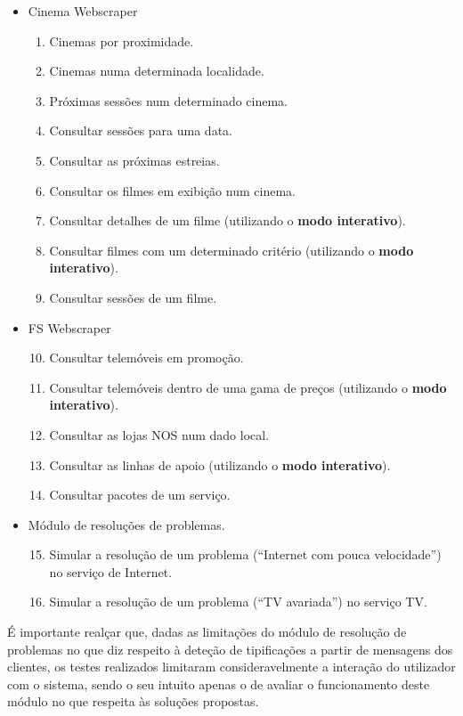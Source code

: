 \documentclass[11pt, a4paper]{article}
\begin{document}
\begin{itemize}
    \item Cinema Webscraper
        \begin{enumerate}
            \item Cinemas por proximidade.
            \item Cinemas numa determinada localidade.
            \item Próximas sessões num determinado cinema.
            \item Consultar sessões para uma data.
            \item Consultar as próximas estreias.
            \item Consultar os filmes em exibição num cinema.
            \item Consultar detalhes de um filme (utilizando o \textbf{modo interativo}).
            \item Consultar filmes com um determinado critério (utilizando o \textbf{modo interativo}).
            \item Consultar sessões de um filme.
        \end{enumerate}
    \item FS Webscraper
        \begin{enumerate}
            \setcounter{enumi}{9}
            \item Consultar telemóveis em promoção.
            \item Consultar telemóveis dentro de uma gama de preços (utilizando o \textbf{modo interativo}).
            \item Consultar as lojas NOS num dado local.
            \item Consultar as linhas de apoio (utilizando o \textbf{modo interativo}).
            \item Consultar pacotes de um serviço.
        \end{enumerate}
    \item Módulo de resoluções de problemas.
        \begin{enumerate}
        \setcounter{enumi}{14}
            \item Simular a resolução de um problema (``Internet com pouca velocidade'') no serviço de Internet.
            \item Simular a resolução de um problema (``TV avariada'') no serviço TV.
        \end{enumerate}
\end{itemize}

É importante realçar que, dadas as limitações do módulo de resolução de problemas no que diz respeito
à deteção de tipificações a partir de mensagens dos clientes, os testes realizados limitaram consideravelmente
a interação do utilizador com o sistema, sendo o seu intuito apenas o de avaliar o funcionamento deste
módulo no que respeita às soluções propostas.
\end{document}
